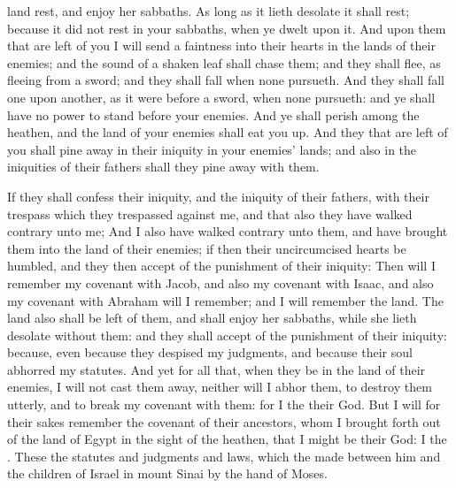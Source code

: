 {land
rest, and
enjoy her
sabbaths.
As long
as it lieth
desolate it shall
rest; because it did not
rest in your
sabbaths, when ye
dwelt upon it.
And upon them that are
left
{} of you I will
send a
faintness into their
hearts in the
lands of their
enemies; and the
sound of a
shaken
leaf shall
chase them; and they shall
flee, as
fleeing from a
sword; and they shall
fall when none
pursueth.
And they shall
fall
one upon
another, as it were
before a
sword, when none
pursueth: and ye shall have no power to
stand
before your
enemies.
And ye shall
perish among the
heathen, and the
land of your
enemies shall eat you
up.
And they that are
left of you shall pine
away in their
iniquity in your
enemies’
lands; and also in the
iniquities of their
fathers shall they pine
away with them.
\par }{\PP {}If they shall
confess their
iniquity, and the
iniquity of their
fathers, with their
trespass which they
trespassed against me, and that also they have
walked
contrary unto me;
And
{} I also have
walked
contrary unto them, and have
brought them into the
land of their
enemies; if
then their
uncircumcised
hearts be
humbled, and they then
accept of the punishment of their
iniquity:
Then will I
remember my
covenant with
Jacob, and also my
covenant with
Isaac, and also my
covenant with
Abraham will I
remember; and I will
remember the
land.
The
land also shall be
left of them, and shall
enjoy her
sabbaths, while she lieth
desolate without them: and they shall
accept of the punishment of their
iniquity:
because, even
because they
despised my
judgments, and because their
soul
abhorred my
statutes.
And
yet for all
that, when they
be in the
land of their
enemies, I will not cast them
away, neither will I
abhor them, to destroy them
utterly, and to
break my
covenant with them: for I
{} the
{} their
God.
But I will for their sakes
remember the
covenant of their
ancestors, whom I brought
forth out of the
land of
Egypt in the
sight of the
heathen, that I might be their
God: I
{} the
{}.
These
{} the
statutes and
judgments and
laws, which the
{}
made between him and the
children of
Israel in
mount
Sinai by the
hand of
Moses.

}
